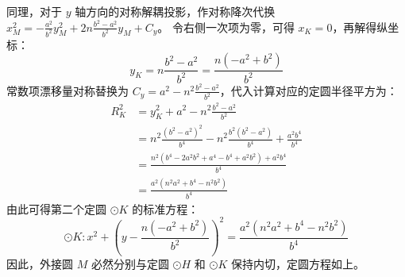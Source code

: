 \begin{solution}
同理，对于 $y$ 轴方向的对称解耦投影，作对称降次代换 $x_M^2 = -\frac{a^2}{b^2} y_M^2 + 2n \frac{b^2-a^2}{b^2} y_M + C_y$。
令右侧一次项为零，可得 $x_K = 0$，再解得纵坐标：
$$ y_K = n \frac{b^2-a^2}{b^2} = \frac{n(-a^2 + b^2)}{b^2} $$
常数项漂移量对称替换为 $C_y = a^2 - n^2 \frac{b^2-a^2}{b^2}$，代入计算对应的定圆半径平方为：
\begin{align*}
R_K^2 &= y_K^2 + a^2 - n^2 \frac{b^2-a^2}{b^2} \\
&= n^2 \frac{(b^2-a^2)^2}{b^4} - n^2 \frac{b^2(b^2-a^2)}{b^4} + \frac{a^2 b^4}{b^4} \\
&= \frac{n^2 (b^4 - 2a^2b^2 + a^4 - b^4 + a^2b^2) + a^2 b^4}{b^4} \\
&= \frac{a^2(n^2a^2 + b^4 - n^2b^2)}{b^4}
\end{align*}
由此可得第二个定圆 $\odot K$ 的标准方程：
$$ \odot K: x^2 + \left(y - \frac{n(-a^2 + b^2)}{b^2}\right)^2 = \frac{a^2(n^2a^2 + b^4 - n^2b^2)}{b^4} $$
因此，外接圆 $M$ 必然分别与定圆 $\odot H$ 和 $\odot K$ 保持内切，定圆方程如上。
\end{solution}

